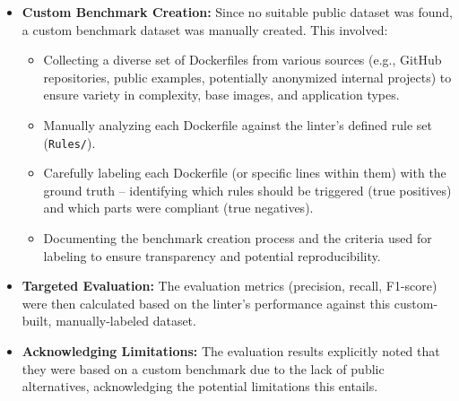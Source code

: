 \begin{itemize}
\begin{itemize}
            \item \textbf{Custom Benchmark Creation:} Since no suitable public dataset was found, a custom benchmark dataset was manually created. This involved:
                \begin{itemize}
                    \item Collecting a diverse set of Dockerfiles from various sources (e.g., GitHub repositories, public examples, potentially anonymized internal projects) to ensure variety in complexity, base images, and application types.
                    \item Manually analyzing each Dockerfile against the linter's defined rule set (\texttt{Rules/}).
                    \item Carefully labeling each Dockerfile (or specific lines within them) with the ground truth – identifying which rules should be triggered (true positives) and which parts were compliant (true negatives).
                    \item Documenting the benchmark creation process and the criteria used for labeling to ensure transparency and potential reproducibility.
                \end{itemize}
            \item \textbf{Targeted Evaluation:} The evaluation metrics (precision, recall, F1-score) were then calculated based on the linter's performance against this custom-built, manually-labeled dataset.
            \item \textbf{Acknowledging Limitations:} The evaluation results explicitly noted that they were based on a custom benchmark due to the lack of public alternatives, acknowledging the potential limitations this entails.
        \end{itemize}
\end{itemize}

